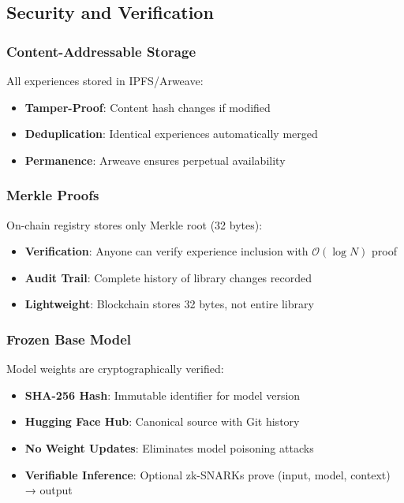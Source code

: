 \subsection{Security and Verification}

\subsubsection{Content-Addressable Storage}
All experiences stored in IPFS/Arweave:
\begin{itemize}
    \item \textbf{Tamper-Proof}: Content hash changes if modified
    \item \textbf{Deduplication}: Identical experiences automatically merged
    \item \textbf{Permanence}: Arweave ensures perpetual availability
\end{itemize}

\subsubsection{Merkle Proofs}
On-chain registry stores only Merkle root (32 bytes):
\begin{itemize}
    \item \textbf{Verification}: Anyone can verify experience inclusion with $\mathcal{O}(\log N)$ proof
    \item \textbf{Audit Trail}: Complete history of library changes recorded
    \item \textbf{Lightweight}: Blockchain stores 32 bytes, not entire library
\end{itemize}

\subsubsection{Frozen Base Model}
Model weights are cryptographically verified:
\begin{itemize}
    \item \textbf{SHA-256 Hash}: Immutable identifier for model version
    \item \textbf{Hugging Face Hub}: Canonical source with Git history
    \item \textbf{No Weight Updates}: Eliminates model poisoning attacks
    \item \textbf{Verifiable Inference}: Optional zk-SNARKs prove (input, model, context) → output
\end{itemize}

